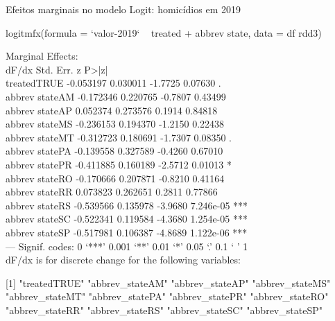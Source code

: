 \documentclass{beamer}
\begin{document}
\begin{frame}{Efeitos marginais no modelo Logit: homicídios em 2019}
	\begin{tiny}
		logitmfx(formula = `valor-2019` ~ treated + abbrev state, data = df rdd3)
		
		Marginal Effects: \\
		dF/dx Std. Err.       z     P>|z|    \\
		treatedTRUE    -0.053197  0.030011 -1.7725   0.07630 . \\ 
		abbrev stateAM -0.172346  0.220765 -0.7807   0.43499    \\
		abbrev stateAP  0.052374  0.273576  0.1914   0.84818    \\
		abbrev stateMS -0.236153  0.194370 -1.2150   0.22438    \\
		abbrev stateMT -0.312723  0.180691 -1.7307   0.08350 .  \\
		abbrev statePA -0.139558  0.327589 -0.4260   0.67010    \\
		abbrev statePR -0.411885  0.160189 -2.5712   0.01013 *  \\
		abbrev stateRO -0.170666  0.207871 -0.8210   0.41164    \\
		abbrev stateRR  0.073823  0.262651  0.2811   0.77866    \\
		abbrev stateRS -0.539566  0.135978 -3.9680 7.246e-05 *** \\
		abbrev stateSC -0.522341  0.119584 -4.3680 1.254e-05 ***\\
		abbrev stateSP -0.517981  0.106387 -4.8689 1.122e-06 ***\\
		---
		Signif. codes:  0 ‘***’ 0.001 ‘**’ 0.01 ‘*’ 0.05 ‘.’ 0.1 ‘ ’ 1\\
		
		dF/dx is for discrete change for the following variables:
		
		[1] "treatedTRUE"    "abbrev_stateAM" "abbrev_stateAP" "abbrev_stateMS"\\
		[5] "abbrev_stateMT" "abbrev_statePA" "abbrev_statePR" "abbrev_stateRO"\\
		[9] "abbrev_stateRR" "abbrev_stateRS" "abbrev_stateSC" "abbrev_stateSP"\\
	\end{tiny}
\end{frame}
\end{document}
